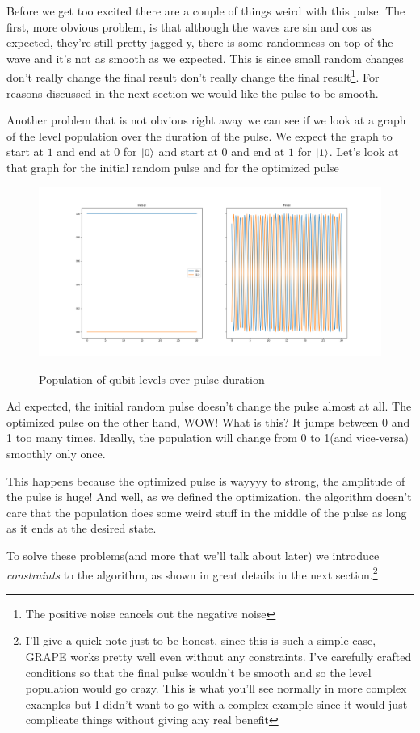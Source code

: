 \documentclass[english, a4paper, 12pt, twoside]{article}
\numberwithin{equation}{section} %
\begin{document}
Before we get too excited there are a couple of things weird with this pulse. The first, more obvious problem, is that although the waves are sin and cos as expected, they're still pretty jagged-y, there is some randomness on top of the wave and it's not as smooth as we expected. This is since small random changes don't really change the final result don't really change the final result\footnote{The positive noise cancels out the negative noise}. For reasons discussed in the next section we would like the pulse to be smooth.

Another problem that is not obvious right away we can see if we look at a graph of the level population over the duration of the pulse. We expect the graph to start at $1$ and end at $0$ for $\ket{0}$ and start at $0$ and end at $1$ for $\ket{1}$. Let's look at that graph for the initial random pulse and for the optimized pulse
\begin{figure}[H]
    \centering
    \caption{Population of qubit levels over pulse duration}
    \includegraphics[width=1\columnwidth]{Results/No-Constraints-single-qubit/level-population.png}
    \label{fig:GRAPE-first-example-level-population}
\end{figure}  %
Ad expected, the initial random pulse doesn't change the pulse almost at all. The optimized pulse on the other hand, WOW! What is this? It jumps between 0 and 1 too many times. Ideally, the population will change from 0 to 1(and vice-versa) smoothly only once.

This happens because the optimized pulse is wayyyy to strong, the amplitude of the pulse is huge! And well, as we defined the optimization, the algorithm doesn't care that the population does some weird stuff in the middle of the pulse as long as it ends at the desired state.

To solve these problems(and more that we'll talk about later) we introduce \textit{constraints} to the algorithm, as shown in great details in the next section.\footnote{I'll give a quick note just to be honest, since this is such a simple case, GRAPE works pretty well even without any constraints. I've carefully crafted conditions so that the final pulse wouldn't be smooth and so the level population would go crazy. This is what you'll see normally in more complex examples but I didn't want to go with a complex example since it would just complicate things without giving any real benefit}
\end{document}
